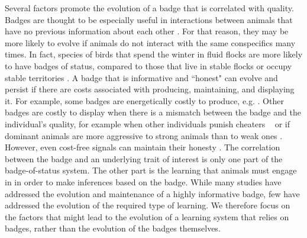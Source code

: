 Several factors promote the evolution of a badge that is correlated with quality. Badges are thought to be especially useful in interactions between animals that have no previous information about each other \citep{Lemel:1993ve,Solberg:1997uq,Smith2003AnimalSignals,Remy:2010fk}. For that reason, they may be more likely to evolve if animals do not interact with the same conspecifics many times. In fact, species of birds that spend the winter in fluid flocks are more likely to have badges of status, compared to those that live in stable flocks or occupy stable territories \citep{Rohwer:1975fk,Tibbetts:2009kx}. 
A badge that is informative and ``honest" can evolve and persist if there are costs associated with producing, maintaining, and displaying it. For example, some badges are energetically costly to produce, e.g. \citep{Veiga:1995ys,Buchanan:2001zr,West:2002ly}. Other badges are costly to display when there is a mismatch between the badge and the individual's quality, for example when other individuals punish cheaters ~\citep{Molles:2001kx,Smith2003AnimalSignals,Tibbetts:2004kx} or if dominant animals are more aggressive to strong animals than to weak ones \citep{Rohwer:1981vn,Thompson:2014fk}.   
However, even cost-free signals can maintain their honesty \citep{Dawkins:1991ly,Lachmann:2001uq}.
The correlation between the badge and an underlying trait of interest is only one part of the badge-of-status system. The other part is the learning that animals must engage in in order to make inferences based on the badge. While many studies have addressed the evolution and maintenance of a highly informative badge, few have addressed the evolution of the required type of learning.  We therefore focus on the factors that might lead to the evolution of a learning system that relies on badges, rather than the evolution of the badges themselves.


